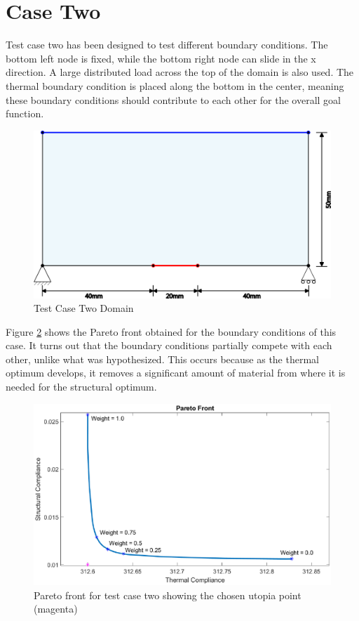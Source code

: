 \section{Case Two}
Test case two has been designed to test different boundary conditions. The bottom left node is fixed, while the bottom right node can slide in the x direction. A large distributed load across the top of the domain is also used. The thermal boundary condition is placed along the bottom in the center, meaning these boundary conditions should contribute to each other for the overall goal function.
\begin{figure}[ht]
    \centering
    \includegraphics[width=0.8\linewidth]{figures/chapter_6/Case2Domain.png}
    \caption{Test Case Two Domain}
    \label{fig:test_case_two_domain}
\end{figure}

Figure \ref{fig:test_case_two_pareto_front} shows the Pareto front obtained for the boundary conditions of this case. It turns out that the boundary conditions partially compete with each other, unlike what was hypothesized. This occurs because as the thermal optimum develops, it removes a significant amount of material from where it is needed for the structural optimum. 
\begin{figure}[ht]
    \centering
    \includegraphics[width=0.6\linewidth]{figures/chapter_6/Case1_ParetoFront.eps} 
    \caption{Pareto front for test case two showing the chosen utopia point (magenta)}
    \label{fig:test_case_two_pareto_front}
\end{figure}

